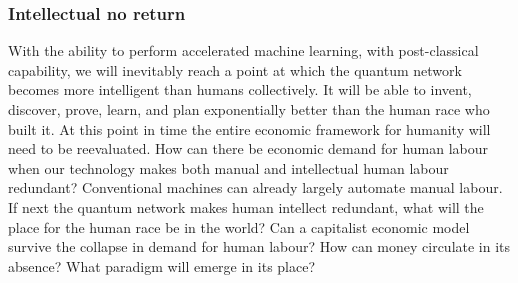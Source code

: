 %
%

\subsubsection{Intellectual no return}

With the ability to perform accelerated machine learning, with post-classical capability, we will inevitably reach a point at which the quantum network becomes more intelligent than humans collectively. It will be able to invent, discover, prove, learn, and plan exponentially better than the human race who built it. At this point in time the entire economic framework for humanity will need to be reevaluated. How can there be economic demand for human labour when our technology makes both manual and intellectual human labour redundant? Conventional machines can already largely automate manual labour. If next the quantum network makes human intellect redundant, what will the place for the human race be in the world? Can a capitalist economic model survive the collapse in demand for human labour? How can money circulate in its absence? What paradigm will emerge in its place?


